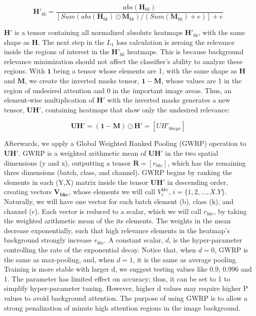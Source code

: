\documentclass[fleqn,10pt]{wlscirep}
\begin{document}
{\begin{equation}
\bm{H'}_{bk}=\frac{abs(\bm{H}_{bk})}{[Sum(abs(\bm{H}_{bk}) \odot \bm{M}_{bk})/(Sum(\bm{M}_{bk})+e)] +e}
\label{eqabs}
\end{equation}

$\bm{H'}$ is a tensor containing all normalized absolute heatmaps $\bm{H'}_{bk}$, with the same shape as $\bm{H}$. The next step in the $L_{1}$ loss calculation is zeroing the relevance inside the regions of interest in the $\bm{H'}_{bk}$ heatmaps. This is because background relevance minimization should not affect the classifier's ability to analyze these regions. With $\bm{1}$ being a tensor whose elements are 1, with the same shape as $\bm{H}$ and $\bm{M}$, we create the inverted masks tensor, $\bm{1}-\bm{M}$, whose values are 1 in the region of undesired attention and 0 in the important image areas. Thus, an element-wise multiplication of $\bm{H'}$ with the inverted masks generates a new tensor, $\bm{UH'}$, containing heatmaps that show only the undesired relevance:

\begin{equation}
\bm{UH'}=(\bm{1}-\bm{M}) \odot \bm{H'}=[UH'_{bkcyx}]
\end{equation}


Afterwards, we apply a Global Weighted Ranked Pooling\cite{GWRP} (GWRP) operation to $\bm{UH'}$. GWRP is a weighted arithmetic mean of $\bm{UH'}$ in the two spatial dimensions (y and x), outputting a tensor $\bm{R}=[r_{bkc}]$, which has the remaining three dimensions (batch, class, and channel). GWRP begins by ranking the elements in each (Y,X) matrix inside the tensor $\bm{UH'}$ in descending order, creating vectors $\bm{V_{bkc}}$, whose elements we will call $V_{i}^{bkc}$, $i=\{1,2,...,X.Y\}$. Naturally, we will have one vector for each batch element (b), class (k), and channel (c). Each vector is reduced to a scalar, which we will call $r_{bkc}$, by taking the weighted arithmetic mean of the its elements. The weights in the mean decrease exponentially, such that high relevance elements in the heatmap's background strongly increase $r_{bkc}$. A constant scalar, $d$, is the hyper-parameter controlling the rate of the exponential decay. Notice that, when $d=0$, GWRP is the same as max-pooling, and, when $d=1$, it is the same as average pooling. Training is more stable with larger d, we suggest testing values like 0.9, 0.996 and 1. The parameter has limited effect on accuracy; thus, it can be set to 1 to simplify hyper-parameter tuning. However, higher d values may require higher P values to avoid background attention. The purpose of using GWRP is to allow a strong penalization of minute high attention regions in the image background.

}
\end{document}
